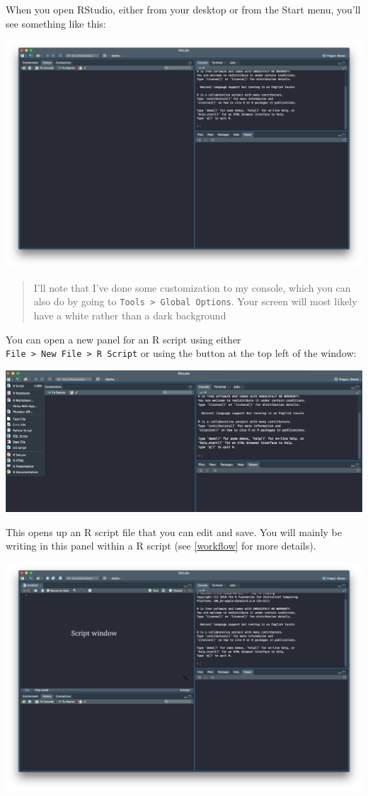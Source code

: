 \documentclass[12pt,letterpaperpaper,openany]{book}
\begin{document}
When you open RStudio, either from your desktop or from the Start menu, you'll
see something like this:

\includegraphics{img/RStudio.png}

\begin{quote}
I'll note that I've done some customization to my console, which you can also do by going to
\texttt{Tools\ \textgreater{}\ Global\ Options}. Your screen will most likely have a white rather than a dark background
\end{quote}

You can open a new panel for an R script using either \texttt{File\ \textgreater{}\ New\ File\ \textgreater{}\ R\ Script} or
using the button at the top left of the window:

\includegraphics{img/OpenScript.png}

This opens up an R script file that you can edit and save. You will mainly be writing
in this panel within a R script (see \ref{workflow} for more details).

\includegraphics{img/ScriptPanel.png}
\end{document}
